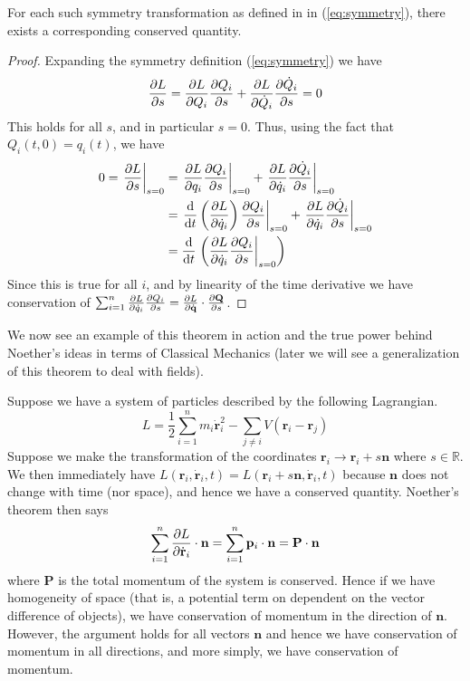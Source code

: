 \begin{theorem}\label{noetherian}
    For each such symmetry transformation as defined in in (\ref{eq:symmetry}),
there exists a corresponding conserved quantity.
\end{theorem}
\begin{proof}
    Expanding the symmetry definition (\ref{eq:symmetry}) we have
    \begin{equation}
        \pdv{L}{s} = \pdv{L}{Q_i}\pdv{Q_i}{s} + \pdv{L}{\dot{Q}_i}\pdv{\dot{Q}_i}{s} = 0
    \end{equation}
    This holds for all \(s\), and in particular \(s = 0\). Thus, using the fact
    that \(Q_i(t,0) = q_i(t)\), we have
    \begin{align}
        0 = \left.\pdv{L}{s}\right|_{s = 0} & = \left.\pdv{L}{q_i}\pdv{Q_i}{s}\right|_{s = 0} + \left.\pdv{L}{\dot{q}_i}\pdv{\dot{Q}_i}{s}\right|_{s = 0} \\
        & = \left.\dv{t}\left(\pdv{L}{\dot{q}_i}\right)\pdv{Q_i}{s}\right|_{s = 0} + \left.\pdv{L}{\dot{q}_i}\pdv{\dot{Q}_i}{s}\right|_{s = 0} \\
        & = \dv{t}\left.\left(\pdv{L}{\dot{q}_i}\pdv{Q_i}{s}\right|_{s = 0}\right)
    \end{align}
    Since this is true for all \(i\), and by linearity of the time derivative we
    have conservation of \(\sum_{i = 1}^n \pdv{L}{\dot{q}_i}\pdv{Q_i}{s} = \pdv{L}{\dot{\mathbf{q}}}\cdot\pdv{\mathbf{Q}}{s}\).
\end{proof}
We now see an example of this theorem in action and the true power behind
Noether's ideas in terms of Classical Mechanics (later we will see a
generalization of this theorem to deal with fields).
\begin{example}\label{momcons}
    Suppose we have a system of particles described by the following Lagrangian.
    \begin{equation}
        L = \frac{1}{2}\sum_{i = 1}^n m_i\dot{\mathbf{r}}_i^2 - \sum_{j\neq i}V(\mathbf{r}_i - \mathbf{r}_j)
    \end{equation}
    Suppose we make the transformation of the coordinates \(\mathbf{r}_i\to \mathbf{r}_i + s\mathbf{n}\) where \(s\in\mathbb{R}\). We then immediately have \(L(\mathbf{r}_i, \dot{\mathbf{r}}_i, t) = L(\mathbf{r}_i + s\mathbf{n}, \dot{\mathbf{r}}_i, t)\) because \(\mathbf{n}\) does not change with time (nor space), and hence we have a conserved quantity. Noether's theorem then says
    \begin{equation}
        \sum_{i = 1}^n\pdv{L}{\dot{\mathbf{r}}_i}\cdot\mathbf{n} = \sum_{i = 1}^n \mathbf{p}_i\cdot\mathbf{n} = \mathbf{P}\cdot\mathbf{n}
    \end{equation}
    where \(\mathbf{P}\) is the total momentum of the system is conserved. Hence
if we have homogeneity of space (that is, a potential term on dependent on the
vector difference of objects), we have conservation of momentum in the direction
of \(\mathbf{n}\). However, the argument holds for all vectors \(\mathbf{n}\)
and hence we have conservation of momentum in all directions, and more simply,
we have conservation of momentum.
\end{example}
